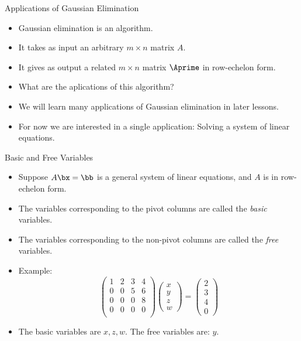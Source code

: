 \documentclass{beamer}
\begin{document}

\begin{frame}{Applications of Gaussian Elimination}

\begin{itemize}
\item Gaussian elimination is an algorithm.
\item It takes as input an arbitrary $m\times n$ matrix $A$.
\item It gives as output a related $m\times n$ matrix $\Aprime$ in row-echelon form.
\item What are the aplications of this algorithm?
\item We will learn many applications of Gaussian elimination in later lessons.
\item For now we are interested in a single application: Solving a system of linear equations.
\end{itemize}
\end{frame}

\begin{frame}{Basic and Free Variables}

\begin{itemize}
\item Suppose $A\bx=\bb$ is a general system of linear equations, and $A$ is in row-echelon form.
\item The variables corresponding to the pivot columns are called the \emph{basic} variables.
\item The variables corresponding to the non-pivot columns are called the \emph{free} variables.
\item Example:
$$
\begin{pmatrix}
1 & 2 & 3 & 4 \\
0 & 0 & 5 & 6 \\
0 & 0 & 0 & 8 \\
0 & 0 & 0 & 0 \\
\end{pmatrix}
\begin{pmatrix}
x \\ y \\ z \\ w
\end{pmatrix}
=
\begin{pmatrix}
2 \\ 3 \\ 4 \\ 0
\end{pmatrix}
$$
\item The basic variables are $x,z,w$. The free variables are: $y$.
\end{itemize}
\end{frame}
\end{document}
